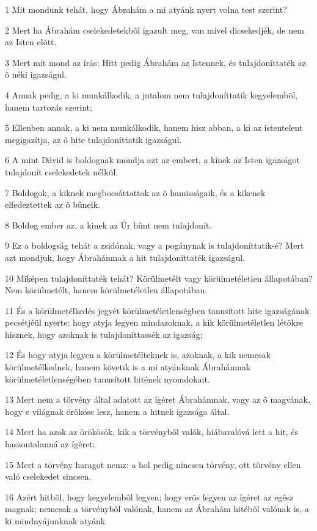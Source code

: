 \par 1 Mit mondunk tehát, hogy Ábrahám a mi atyánk nyert volna test szerint?
\par 2 Mert ha Ábrahám cselekedetekbõl igazult meg, van mivel dicsekedjék, de nem az Isten elõtt.
\par 3 Mert mit mond az írás: Hitt pedig Ábrahám az Istennek, és tulajdoníttaték az õ néki igazságul.
\par 4 Annak pedig, a ki munkálkodik, a jutalom nem tulajdoníttatik kegyelembõl, hanem tartozás szerint;
\par 5 Ellenben annak, a ki nem munkálkodik, hanem hisz abban, a ki az istentelent megigazítja, az õ hite tulajdoníttatik igazságul.
\par 6 A mint Dávid is boldognak mondja azt az embert, a kinek az Isten igazságot tulajdonít cselekedetek nélkül.
\par 7 Boldogok, a kiknek megbocsáttattak az õ hamisságaik, és a kikenek elfedeztettek az õ bûneik.
\par 8 Boldog ember az, a kinek az Úr bûnt nem tulajdonít.
\par 9 Ez a boldogság tehát a zsidónak, vagy a pogánynak is tulajdoníttatik-é? Mert azt mondjuk, hogy Ábrahámnak a hit tulajdoníttaték igazságul.
\par 10 Miképen tulajdoníttaték tehát? Körülmetélt vagy körülmetéletlen állapotában? Nem körülmetélt, hanem körülmetéletlen állapotában.
\par 11 És a körülmetélkedés jegyét körülmetéletlenségben tanusított hite igazságának pecsétjéül nyerte: hogy atyja legyen mindazoknak, a kik körülmetéletlen létökre  hisznek, hogy azoknak is tulajdoníttassék az igazság;
\par 12 És hogy atyja legyen a körülmetélteknek is, azoknak, a kik nemcsak körülmetélkednek, hanem követik is a mi atyánknak Ábrahámnak körülmetéletlenségében tanusított hitének nyomdokait.
\par 13 Mert nem a törvény által adatott az ígéret Ábrahámnak, vagy az õ magvának, hogy e világnak örököse lesz, hanem a hitnek igazsága által.
\par 14 Mert ha azok az örökösök, kik a törvénybõl valók, hiábavalóvá lett a hit, és haszontalanná az ígéret:
\par 15 Mert a törvény haragot nemz: a hol pedig nincsen törvény, ott törvény ellen való cselekedet sincsen.
\par 16 Azért hitbõl, hogy kegyelembõl legyen; hogy erõs legyen az ígéret az egész magnak; nemcsak a törvénybõl valónak, hanem az Ábrahám hitébõl valónak is, a ki mindnyájunknak atyánk
